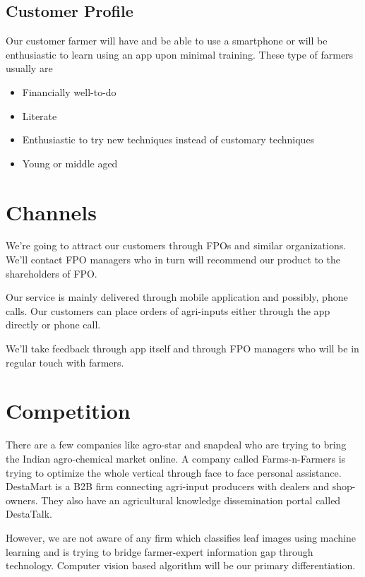 \documentclass[a4paper]{article}
\begin{document}
\subsection{Customer Profile}
Our customer farmer will have and be able to use a smartphone or will be enthusiastic to learn using an app upon minimal training.
These type of farmers usually are 
\begin{itemize}
\item Financially well-to-do
\item Literate
\item Enthusiastic to try new techniques instead of customary techniques
\item Young or middle aged
\end{itemize} 

\section{Channels}
We're going to attract our customers through FPOs and similar organizations.
We'll contact FPO managers who in turn will recommend our product to the shareholders of FPO.

Our service is mainly delivered through mobile application and possibly, phone calls.
Our customers can place orders of agri-inputs either through the app directly or phone call.

We'll take feedback through app itself and through FPO managers who will be in regular touch with farmers. 



\section{Competition}
There are a few companies like agro-star and snapdeal who are trying to bring the Indian agro-chemical market online. 
A company called Farms-n-Farmers is trying to optimize the whole vertical through face to face personal assistance. DestaMart is a B2B firm connecting agri-input producers with dealers and shop-owners. 
They also have an agricultural knowledge dissemination portal called DestaTalk.

However, we are not aware of any firm which classifies leaf images using machine learning and is trying to bridge farmer-expert information gap through technology.
Computer vision based algorithm will be our primary differentiation.
\end{document}
